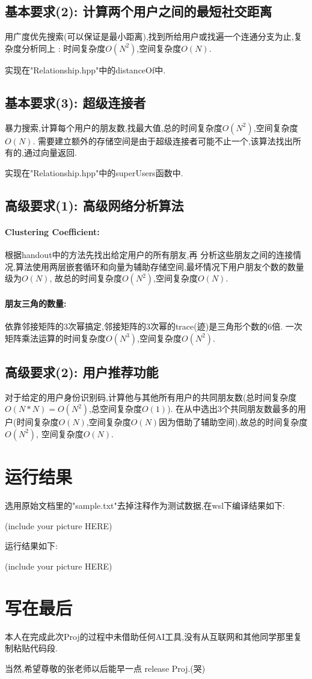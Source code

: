 \documentclass{article}
\begin{document}
\begin{CJK*}{UTF8}{gbsn}
\subsection{基本要求(2): 计算两个用户之间的最短社交距离}
\par 用广度优先搜索(可以保证是最小距离),找到所给用户或找遍一个连通分支为止,复杂度分析同上
: 时间复杂度$O(N^2)$,空间复杂度$O(N)$.
\par 实现在"Relationship.hpp"中的distanceOf中.
\subsection{基本要求(3): 超级连接者}
\par 暴力搜索,计算每个用户的朋友数,找最大值,总的时间复杂度$O(N^2)$,空间复杂度$O(N)$.
需要建立额外的存储空间是由于超级连接者可能不止一个,该算法找出所有的,通过向量返回.
\par 实现在"Relationship.hpp"中的superUsers函数中.
\subsection{高级要求(1): 高级网络分析算法}
\paragraph{Clustering Coefficient: } 根据handout中的方法先找出给定用户的所有朋友,再
分析这些朋友之间的连接情况,算法使用两层嵌套循环和向量为辅助存储空间,最坏情况下用户朋友个数的数量级为$O(N)$,
故总的时间复杂度$O(N^2)$,空间复杂度$O(N)$.
\paragraph{朋友三角的数量: }依靠邻接矩阵的3次幂搞定,邻接矩阵的3次幂的trace(迹)是三角形个数的6倍.
一次矩阵乘法运算的时间复杂度$O(N^3)$,空间复杂度$O(N^2)$.
\subsection{高级要求(2): 用户推荐功能}
\par 对于给定的用户身份识别码,计算他与其他所有用户的共同朋友数(总时间复杂度$O(N*N)=O(N^2)$,总空间复杂度$O(1)$).
在从中选出3个共同朋友数最多的用户(时间复杂度$O(N)$,空间复杂度$O(N)$因为借助了辅助空间),故总的时间复杂度$O(N^2)$,
空间复杂度$O(N)$.

\section{运行结果}
\par 选用原始文档里的"sample.txt"去掉注释作为测试数据,在wsl下编译结果如下:
\par (include your picture HERE)
\par 运行结果如下:
\par (include your picture HERE)

\section{写在最后}
\par 本人在完成此次Proj的过程中未借助任何AI工具,没有从互联网和其他同学那里复制粘贴代码段.
\par 当然,希望尊敬的张老师以后能早一点 release Proj.(哭)

\end{CJK*}
\end{document}
